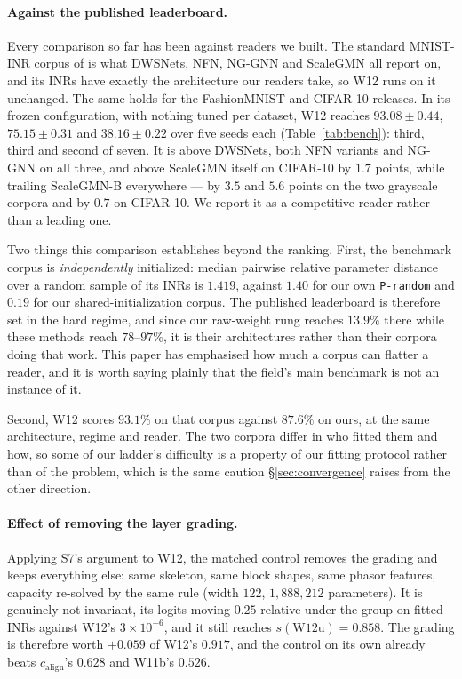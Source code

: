 \documentclass[10pt,twocolumn,letterpaper]{article}
\theoremstyle{definition}
\newcommand{\calign}{c_{\mathrm{align}}}
\begin{document}
\paragraph{Against the published leaderboard.} Every comparison so far has been against readers
we built. The standard MNIST-INR corpus of \citet{navon2023dws} is what DWSNets, NFN, NG-GNN and
ScaleGMN all report on, and its INRs have exactly the architecture our readers take, so W12 runs on
it unchanged. The same holds for the FashionMNIST and CIFAR-10 releases. In its frozen configuration, with
nothing tuned per dataset, W12 reaches $93.08 \pm 0.44$, $75.15 \pm 0.31$ and
$38.16 \pm 0.22$ over five seeds each (Table~\ref{tab:bench}): third, third and second of seven.
It is above DWSNets, both NFN variants and NG-GNN on all three, and above ScaleGMN itself on
CIFAR-10 by $1.7$ points, while trailing ScaleGMN-B everywhere --- by $3.5$ and $5.6$ points on the
two grayscale corpora and by $0.7$ on CIFAR-10. We report it as a competitive reader rather than a
leading one.



\noindent Two things this comparison establishes beyond the ranking. First, the benchmark corpus is
\emph{independently} initialized: median pairwise relative parameter distance over a random sample
of its INRs is $1.419$, against $1.40$ for our own \texttt{P-random} and $0.19$ for our
shared-initialization corpus. The published leaderboard is therefore set in the hard regime, and
since our raw-weight rung reaches $13.9\%$ there while these methods reach $78$--$97\%$, it is
their architectures rather than their corpora doing that work. This paper has emphasised how much
a corpus can flatter a reader, and it is worth saying plainly that the field's main benchmark is
not an instance of it.

Second, W12 scores $93.1\%$ on that corpus against $87.6\%$ on ours, at the same architecture,
regime and reader. The two corpora differ in who fitted them and how, so some of our ladder's
difficulty is a property of our fitting protocol rather than of the problem, which is the same
caution \S\ref{sec:convergence} raises from the other direction.

\paragraph{Effect of removing the layer grading.} Applying S7's argument to W12,
the matched control removes the grading and keeps everything else: same skeleton, same block shapes,
same phasor features, capacity re-solved by the same rule (width $122$, $1{,}888{,}212$ parameters).
It is genuinely not invariant, its logits moving $0.25$ relative under the group on fitted INRs
against W12's $3\times10^{-6}$, and it still reaches $s(\mathrm{W12u}) = \mathbf{0.858}$. The
grading is therefore worth $+0.059$ of W12's $0.917$, and the control on its own already beats
$\calign$'s $0.628$ and W11b's $0.526$.
\end{document}
